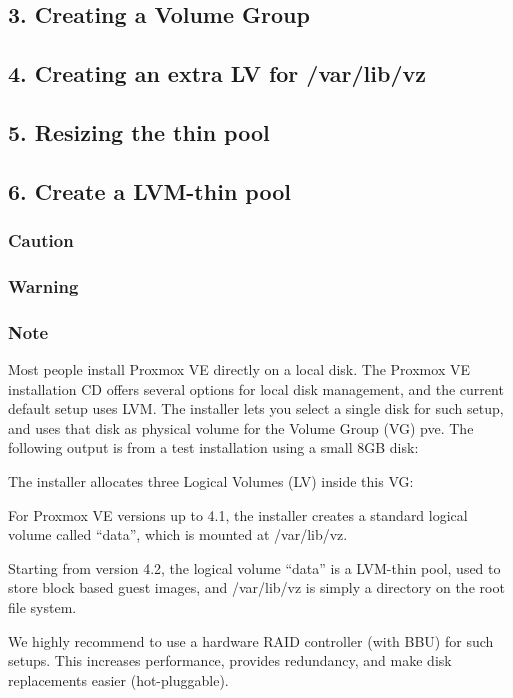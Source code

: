\subsection{3. Creating a Volume Group}

\subsection{4. Creating an extra LV for /var/lib/vz}

\subsection{5. Resizing the thin pool}

\subsection{6. Create a LVM-thin pool}

\subsubsection{Caution}

\subsubsection{Warning}

\subsubsection{Note}

Most people install Proxmox VE directly on a local disk. The Proxmox VE installation CD offers several options for local disk management, and the current default setup uses LVM. The installer lets you select a single disk for such setup, and uses that disk as physical volume for the Volume Group (VG) pve. The following output is from a test installation using a small 8GB disk:

The installer allocates three Logical Volumes (LV) inside this VG:

For Proxmox VE versions up to 4.1, the installer creates a standard logical volume called “data”, which is mounted at /var/lib/vz.

Starting from version 4.2, the logical volume “data” is a LVM-thin pool, used to store block based guest images, and /var/lib/vz is simply a directory on the root file system.

We highly recommend to use a hardware RAID controller (with BBU) for such setups. This increases performance, provides redundancy, and make disk replacements easier (hot-pluggable).

